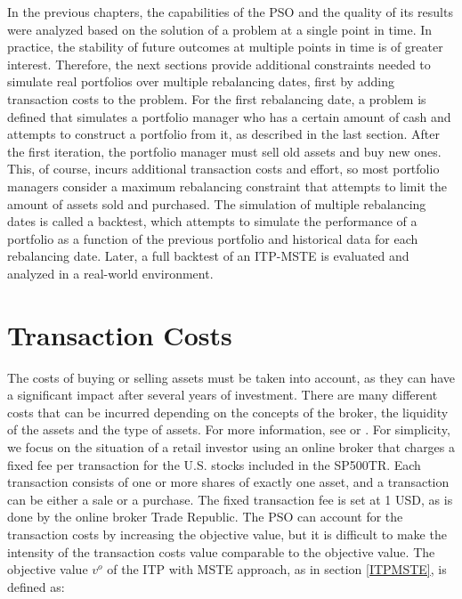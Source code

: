 \documentclass[
  oneside, a4paper, 12pt, openany]{book}
\theoremstyle{definition}
\theoremstyle{definition}
\theoremstyle{definition}
\theoremstyle{definition}
\theoremstyle{remark}
\begin{document}
In the previous chapters, the capabilities of the PSO and the quality of its results were analyzed based on the solution of a problem at a single point in time. In practice, the stability of future outcomes at multiple points in time is of greater interest. Therefore, the next sections provide additional constraints needed to simulate real portfolios over multiple rebalancing dates, first by adding transaction costs to the problem. For the first rebalancing date, a problem is defined that simulates a portfolio manager who has a certain amount of cash and attempts to construct a portfolio from it, as described in the last section. After the first iteration, the portfolio manager must sell old assets and buy new ones. This, of course, incurs additional transaction costs and effort, so most portfolio managers consider a maximum rebalancing constraint that attempts to limit the amount of assets sold and purchased. The simulation of multiple rebalancing dates is called a backtest, which attempts to simulate the performance of a portfolio as a function of the previous portfolio and historical data for each rebalancing date. Later, a full backtest of an ITP-MSTE is evaluated and analyzed in a real-world environment.

\hypertarget{transaction-costs}{%
\section{Transaction Costs}\label{transaction-costs}}

The costs of buying or selling assets must be taken into account, as they can have a significant impact after several years of investment. There are many different costs that can be incurred depending on the concepts of the broker, the liquidity of the assets and the type of assets. For more information, see \citep{AkGa2022} or \citep{NySe2022}. For simplicity, we focus on the situation of a retail investor using an online broker that charges a fixed fee per transaction for the U.S. stocks included in the SP500TR. Each transaction consists of one or more shares of exactly one asset, and a transaction can be either a sale or a purchase. The fixed transaction fee is set at 1 USD, as is done by the online broker Trade Republic. The PSO can account for the transaction costs by increasing the objective value, but it is difficult to make the intensity of the transaction costs value comparable to the objective value. The objective value \(v^o\) of the ITP with MSTE approach, as in section \ref{ITPMSTE}, is defined as:
\end{document}
